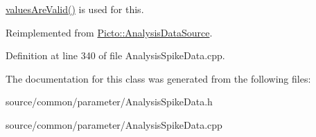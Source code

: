 \hyperlink{class_picto_1_1_parameter_a3443808da4c3edf26f2c3c3772d95b10}{values\-Are\-Valid()} is used for this. 

Reimplemented from \hyperlink{class_picto_1_1_analysis_data_source_a8d43777d1a7d1b1467c9df205d118bb3}{Picto\-::\-Analysis\-Data\-Source}.



Definition at line 340 of file Analysis\-Spike\-Data.\-cpp.



The documentation for this class was generated from the following files\-:\begin{DoxyCompactItemize}
\item 
source/common/parameter/Analysis\-Spike\-Data.\-h\item 
source/common/parameter/Analysis\-Spike\-Data.\-cpp\end{DoxyCompactItemize}
